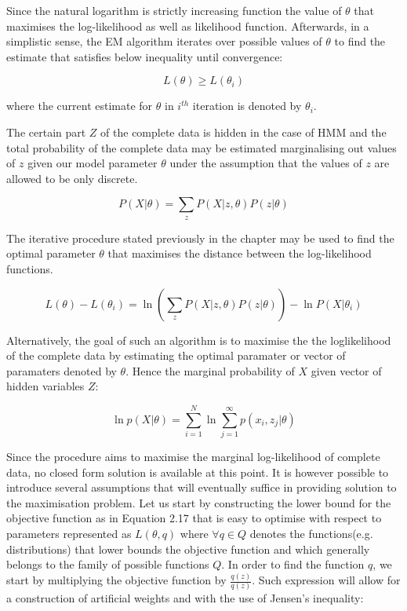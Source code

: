 Since the natural logarithm is strictly increasing function the value of $\theta$ that maximises the log-likelihood as well as likelihood function. Afterwards, in a simplistic sense, the EM algorithm iterates over possible values of $\theta$ to find the estimate that satisfies below inequality until convergence:

\begin{equation}
L(\theta) \geq L(\theta_i)
\end{equation}

where the current estimate for $\theta$ in $i^{th}$ iteration is denoted by $\theta_i$. 

The certain part $Z$ of the complete data is hidden in the case of HMM and the total probability of the complete data may be estimated marginalising out values of $z$ given our model parameter $\theta$ under the assumption that the values of $z$ are allowed to be only discrete. 

\begin{equation}
P(X|\theta) = \sum_z P(X|z,\theta) P(z|\theta)
\end{equation}

The iterative procedure stated previously in the chapter may be used to find the optimal parameter $\theta$ that maximises the distance between the log-likelihood functions. 

\begin{equation}
L(\theta) - L(\theta_i) = \ln (\sum_z P(X|z,\theta) P(z|\theta) ) - \ln P(X|\theta_i)
\end{equation}

Alternatively, the goal of such an algorithm is to maximise the the loglikelihood of the complete data by estimating the optimal paramater or vector of paramaters denoted by $\theta$. Hence the marginal probability of $X$ given vector of hidden variables $Z$:

\begin{equation}
\ln p(X|\theta) = \sum_{i=1}^{N} \ln \sum_{j=1}^{\infty} p(x_i, z_j|\theta)
\end{equation}

Since the procedure aims to maximise the marginal log-likelihood of complete data, no closed form solution is available at this point. It is however possible to introduce several assumptions that will eventually suffice in providing solution to the maximisation problem. Let us start by constructing the lower bound for the objective function as in Equation 2.17 that is easy to optimise with respect to parameters represented as $L(\theta, q)$ where $\forall q \in Q$ denotes the functions(e.g. distributions) that lower bounds the objective function and which generally belongs to the family of possible functions $Q$. In order to find the function $q$, we start by multiplying the objective function by $\frac{q(z)}{q(z)}$. Such expression will allow for a construction of artificial weights and with the use of Jensen's inequality:

